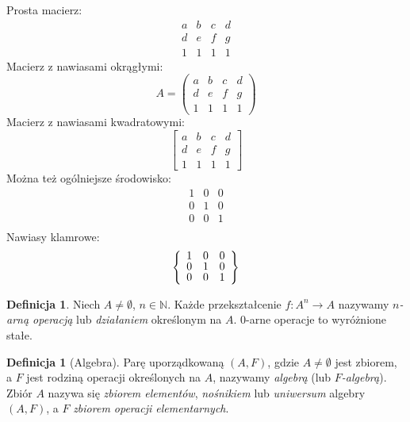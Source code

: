 \documentclass[a4paper,11pt,twoside]{report}
\theoremstyle{definition}
\newtheorem{definition}[theorem]{Definicja}
\begin{document}
Prosta macierz:
\begin{equation*}
  \begin{matrix}
    a & b & c & d \\
    d & e & f & g \\
    1 & 1 & 1 & 1
  \end{matrix}
\end{equation*}
Macierz z nawiasami okrągłymi:
\begin{equation*}
  A =
  \begin{pmatrix}
    a & b & c & d \\
    d & e & f & g \\
    1 & 1 & 1 & 1
  \end{pmatrix}
\end{equation*}
Macierz z nawiasami kwadratowymi:
\begin{equation*}
  \begin{bmatrix}
    a & b & c & d \\
    d & e & f & g \\
    1 & 1 & 1 & 1
  \end{bmatrix}
\end{equation*}
Można też ogólniejsze środowisko:
\begin{equation*}
  \renewcommand{\arraystretch}{0.8}
  \begin{array}{ccc}
    1 & 0 & 0 \\
    0 & 1 & 0 \\
    0 & 0 & 1 \\
  \end{array}
\end{equation*}
Nawiasy klamrowe:
\begin{equation*}
  \left\{
  \renewcommand{\arraystretch}{0.8}
  \begin{array}{ccc}
    1 & 0 & 0 \\
    0 & 1 & 0 \\
    0 & 0 & 1 \\
  \end{array}\right\}
\end{equation*}

\begin{definition}
  Niech $A\neq \emptyset$, $n \in \mathbb{N}$. Każde przekształcenie $f \colon A^n  \to A$ nazywamy \emph{$n$-arną operacją} lub \emph{działaniem} określonym na $A$.
  0-arne operacje to wyróżnione stałe.
\end{definition}


\begin{definition}[Algebra]
  Parę uporządkowaną $(A,F)$, gdzie $A\neq \emptyset$ jest zbiorem, a $F$ jest rodziną operacji określonych na $A$, nazywamy \emph{algebrą} (lub \emph{$F$-algebrą}). Zbiór $A$ nazywa się \emph{zbiorem elementów}, \emph{nośnikiem} lub \emph{uniwersum} algebry $(A,F)$, a $F$ \textit{zbiorem operacji elementarnych}.
\end{definition}
\end{document}
